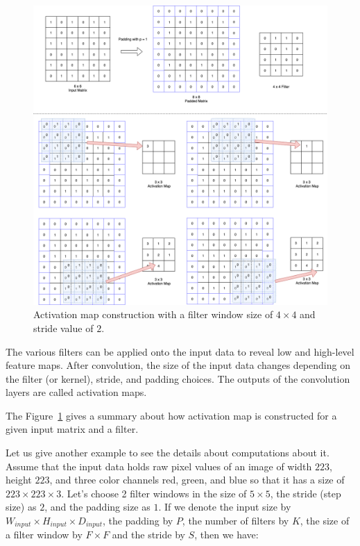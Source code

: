 \begin{figure}[!h]
	\centering
	\includegraphics[width=\linewidth]{fig/conv_layer.png}
	\vspace*{2mm}
	\caption{Activation map construction with a filter window size of  $4 \times 4$ and stride value of $2$.}
	\label{conv_layer}
\end{figure}

The various filters can be applied onto the input data to reveal low and high-level feature maps. After convolution, the size of the input data changes depending on the filter (or kernel), stride, and padding choices. The outputs of the convolution layers are called activation maps.

The Figure~\ref{conv_layer} gives a summary about how activation map is constructed for a given input matrix and a filter.

Let us give another example to see the details about computations about it. Assume that the input data 
holds raw pixel values of an image of width $223$, height $223$, and three color channels red, green, and blue so that it has a size of $223 \times 223 \times 3$. Let's choose 2 filter windows in the size of $5 \times 5$, the stride (step size) as $2$, and the padding size as $1$. If we denote the input size by $W_{input} \times H_{input} \times D_{input}$, the padding by $P$, the number of filters by $K$, the size of a filter window by $F \times F$ and the stride by $S$, then we have: 

